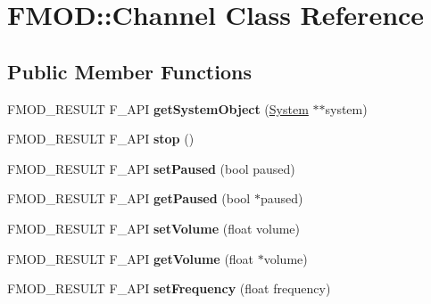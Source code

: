 \hypertarget{class_f_m_o_d_1_1_channel}{}\section{F\+M\+OD\+:\+:Channel Class Reference}
\label{class_f_m_o_d_1_1_channel}
\subsection*{Public Member Functions}
\begin{DoxyCompactItemize}
\item 
F\+M\+O\+D\+\_\+\+R\+E\+S\+U\+LT F\+\_\+\+A\+PI {\bfseries get\+System\+Object} (\hyperlink{class_f_m_o_d_1_1_system}{System} $\ast$$\ast$system)\hypertarget{class_f_m_o_d_1_1_channel_ade71450e7b8a888d4a4f1e73eded4236}{}\label{class_f_m_o_d_1_1_channel_ade71450e7b8a888d4a4f1e73eded4236}

\item 
F\+M\+O\+D\+\_\+\+R\+E\+S\+U\+LT F\+\_\+\+A\+PI {\bfseries stop} ()\hypertarget{class_f_m_o_d_1_1_channel_a89d7bc13ea65f29f306fbd279e54dd08}{}\label{class_f_m_o_d_1_1_channel_a89d7bc13ea65f29f306fbd279e54dd08}

\item 
F\+M\+O\+D\+\_\+\+R\+E\+S\+U\+LT F\+\_\+\+A\+PI {\bfseries set\+Paused} (bool paused)\hypertarget{class_f_m_o_d_1_1_channel_a7610d6be6beec8f7cf6d0230c48c6618}{}\label{class_f_m_o_d_1_1_channel_a7610d6be6beec8f7cf6d0230c48c6618}

\item 
F\+M\+O\+D\+\_\+\+R\+E\+S\+U\+LT F\+\_\+\+A\+PI {\bfseries get\+Paused} (bool $\ast$paused)\hypertarget{class_f_m_o_d_1_1_channel_a551d39aed652cb419ce5ec7256abefb4}{}\label{class_f_m_o_d_1_1_channel_a551d39aed652cb419ce5ec7256abefb4}

\item 
F\+M\+O\+D\+\_\+\+R\+E\+S\+U\+LT F\+\_\+\+A\+PI {\bfseries set\+Volume} (float volume)\hypertarget{class_f_m_o_d_1_1_channel_a641ee780642531cec59aa9ec065d4709}{}\label{class_f_m_o_d_1_1_channel_a641ee780642531cec59aa9ec065d4709}

\item 
F\+M\+O\+D\+\_\+\+R\+E\+S\+U\+LT F\+\_\+\+A\+PI {\bfseries get\+Volume} (float $\ast$volume)\hypertarget{class_f_m_o_d_1_1_channel_aef6f0675ac455547e3a00ce339ca85f9}{}\label{class_f_m_o_d_1_1_channel_aef6f0675ac455547e3a00ce339ca85f9}

\item 
F\+M\+O\+D\+\_\+\+R\+E\+S\+U\+LT F\+\_\+\+A\+PI {\bfseries set\+Frequency} (float frequency)\hypertarget{class_f_m_o_d_1_1_channel_a355cd052a405c0ecdbaac7c65d24148b}{}\label{class_f_m_o_d_1_1_channel_a355cd052a405c0ecdbaac7c65d24148b}


\end{DoxyCompactItemize}
